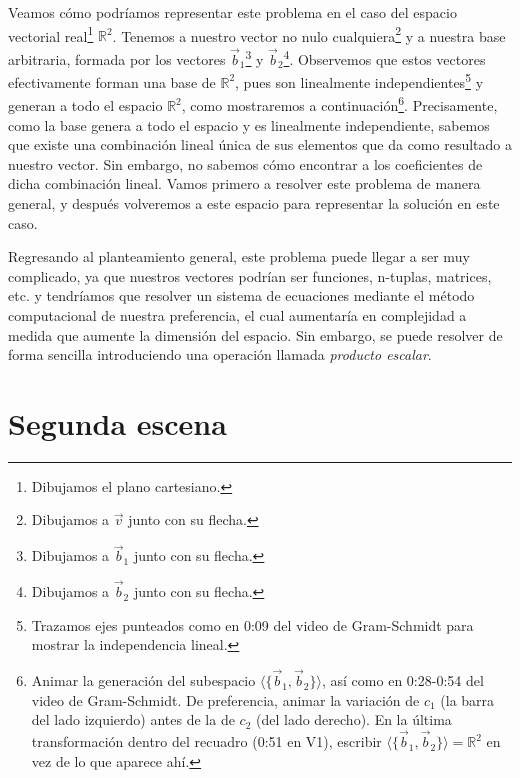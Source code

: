 \documentclass[12pt,dvipsnames]{article}
\numberwithin{equation}{section}
\begin{document}
Veamos cómo podríamos representar este problema en el caso del espacio vectorial real\footnote{Dibujamos el plano cartesiano.} $\mathbb{R}^2$. Tenemos a nuestro vector no nulo cualquiera\footnote{Dibujamos a $\vec{v}$ junto con su flecha.} y a nuestra base arbitraria, formada por los vectores $\vec{b}_1$\footnote{Dibujamos a $\vec{b}_1$ junto con su flecha.} y $\vec{b}_2$\footnote{Dibujamos a $\vec{b}_2$ junto con su flecha.}. Observemos que estos vectores efectivamente forman una base de $\mathbb{R}^2$, pues son linealmente independientes\footnote{Trazamos ejes punteados como en 0:09 del video de Gram-Schmidt para mostrar la independencia lineal.} y generan a todo el espacio $\mathbb{R}^2$, como mostraremos a continuación\footnote{Animar la generación del subespacio $\langle\{\vec{b}_1,\vec{b}_2\}\rangle$, así como en 0:28-0:54 del video de Gram-Schmidt. De preferencia, animar la variación de $c_1$ (la barra del lado izquierdo) antes de la de $c_2$ (del lado derecho). En la última transformación dentro del recuadro (0:51 en V1), escribir $\langle\{\vec{b}_1,\vec{b}_2\}\rangle=\mathbb{R}^2$ en vez de lo que aparece ahí.}. Precisamente, como la base genera a todo el espacio y es linealmente independiente, sabemos que existe una combinación lineal única de sus elementos que da como resultado a nuestro vector. Sin embargo, no sabemos cómo encontrar a los coeficientes de dicha combinación lineal. Vamos primero a resolver este problema de manera general, y después volveremos a este espacio para representar la solución en este caso.

Regresando al planteamiento general, este problema puede llegar a ser muy complicado, ya que nuestros vectores podrían ser funciones, n-tuplas, matrices, etc. y tendríamos que resolver un sistema de ecuaciones \textemdash mediante el método computacional de nuestra preferencia\textemdash, el cual aumentaría en complejidad a medida que aumente la dimensión del espacio. Sin embargo, se puede resolver de forma sencilla introduciendo una operación llamada \emph{producto escalar}.


\newpage
\section{Segunda escena}
\end{document}
